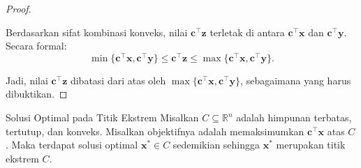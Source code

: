 \begin{proof}
\begin{center}
\end{center}

Berdasarkan sifat kombinasi konveks, nilai \(\mathbf{c}^\top \mathbf{z}\) terletak di antara \(\mathbf{c}^\top \mathbf{x}\) dan \(\mathbf{c}^\top \mathbf{y}\). Secara formal:
\[
\min\{\mathbf{c}^\top \mathbf{x}, \mathbf{c}^\top \mathbf{y}\} \leq \mathbf{c}^\top \mathbf{z} \leq \max\{\mathbf{c}^\top \mathbf{x}, \mathbf{c}^\top \mathbf{y}\}.
\]

Jadi, nilai \(\mathbf{c}^\top \mathbf{z}\) dibatasi dari atas oleh \(\max\{\mathbf{c}^\top \mathbf{x}, \mathbf{c}^\top \mathbf{y}\}\), sebagaimana yang harus dibuktikan.
\end{proof}

\begin{theorem}{Solusi Optimal pada Titik Ekstrem}
\label{thm:extreme_point_optimum}
Misalkan \(C \subseteq \mathbb{R}^n\) adalah himpunan terbatas, tertutup, dan konveks. Misalkan objektifnya adalah memaksimumkan \(\mathbf{c}^\top \mathbf{x}\) atas \(C\). Maka terdapat solusi optimal \(\mathbf{x}^* \in C\) sedemikian sehingga \(\mathbf{x}^*\) merupakan titik ekstrem \(C\).
\end{theorem}

